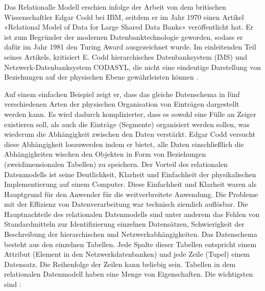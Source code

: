 Das Relationalle Modell erschien infolge der Arbeit von dem britischen Wissenschaftler Edgar Codd bei IBM, seitdem er im Jahr 1970 einen Artikel «Relational Model of Data for Large Shared Data Banks» veröffentlicht hat. Er ist zum Begründer der modernen Datenbanktechnologie geworden, sodass er dafür im Jahr 1981 den Turing Award ausgezeichnet wurde. Im einleitenden Teil seines Artikels, kritisiert E. Codd hierarchisches Datenbanksystem (IMS) und Netzwerk-Datenbanksystem CODASYL, die nicht eine eindeutige Darstellung von Beziehungen auf der physischen Ebene gewährleisten können \cite{codd1970relational}. 

Auf einem einfachen Beispiel zeigt er, dass das gleiche Datenschema in fünf verschiedenen Arten der physischen Organisation von Einträgen dargestellt werden kann. Es wird dadurch komplizierter, dass es sowohl eine Fülle an Zeiger existieren soll, als auch die Einträge (Segmente) organisiert werden sollen, was wiederum die Abhängigkeit zwischen den Daten verstärkt. Edgar Codd versucht diese Abhängigkeit loszuwerden \cite{stonebraker2005goes} indem er bietet, alle Daten einschließlich die Abhängigkeiten wischen den Objekten in Form von Beziehungen (zweidimensionalen Tabellen) zu speichern. Der Vorteil des relationalen Datenmodells ist seine Deutlichkeit, Klarheit und Einfachheit der physikalischen Implementierung auf einem Computer. Diese Einfachheit und Klarheit waren als Hauptgrund für den Anwender für die weitverbreitete Anwendung. Die Probleme mit der Effizienz von Datenverarbeitung war technisch ziemlich auflösbar. Die Hauptnachteile des relationalen Datenmodells sind unter anderem das Fehlen von Standardmitteln zur Identifizierung einzelnen Datensätzen, Schwierigkeit der Beschreibung der hierarchischen und Netzwerkabhängigkeiten. Das Datenschema besteht aus den einzelnen Tabellen. Jede Spalte dieser Tabellen entspricht einem Attribut (Element in den Netzwerkdatenbanken) und jede Zeile (Tupel) einem Datensatz. Die Reihenfolge der Zeilen kann beliebig sein. Tabellen in dem relationalen Datenmodell haben eine Menge von Eigenschaften. Die wichtigsten sind \cite{sauer2002relationale}: 
